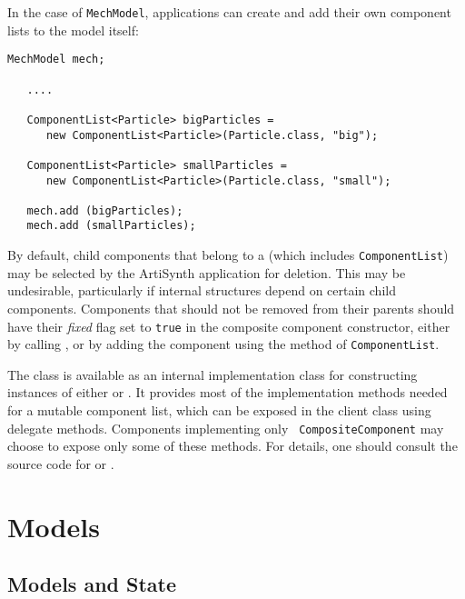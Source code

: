 \documentclass{article}
\begin{document}
In the case of {\tt MechModel}, applications can create and add their
own component lists to the model itself:
\begin{lstlisting}[]
   MechModel mech; 

   ....

   ComponentList<Particle> bigParticles =
      new ComponentList<Particle>(Particle.class, "big");

   ComponentList<Particle> smallParticles =
      new ComponentList<Particle>(Particle.class, "small");

   mech.add (bigParticles);
   mech.add (smallParticles);
\end{lstlisting}

\begin{sideblock}
By default, child components that belong to a
 (which
includes {\tt ComponentList}) may be selected by the ArtiSynth
application for deletion.  This may be undesirable, particularly if
internal structures depend on certain child components.  Components
that should not be removed from their parents should have their {\it
fixed} flag set to {\tt true} in the composite component constructor,
either by calling
, or
by adding the component using the
 method
of {\tt ComponentList}.
\end{sideblock}

The class  is
available as an internal implementation class for constructing
instances of either
 or
.  It
provides most of the implementation methods needed for a mutable
component list, which can be exposed in the client class using
delegate methods.  Components implementing only {\tt
CompositeComponent} may choose to expose only some of these
methods. For details, one should consult the source code for
 or
.

\section{Models}
\label{Models}

\subsection{Models and State}
\label{ModelsAndStateSec}
\end{document}
